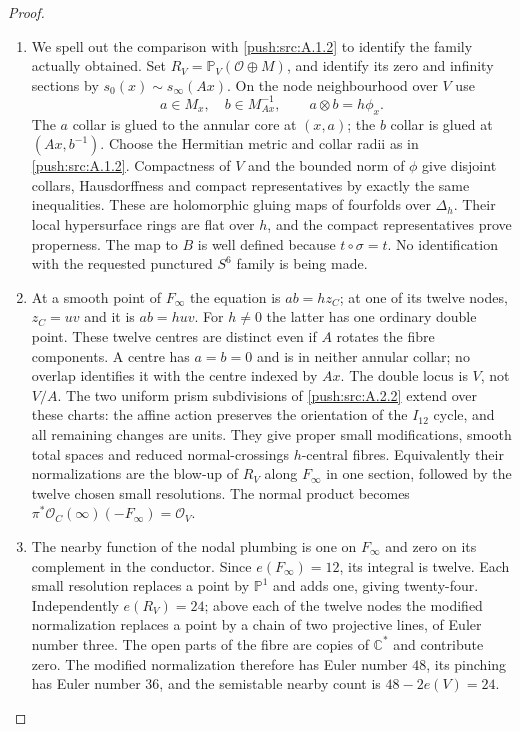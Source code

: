 \begin{proof}
\begin{enumerate}[label=\arabic*.,leftmargin=*]
\item We spell out the comparison with \ref{push:src:A.1.2}
to identify the family actually obtained.
Set $R_V=\mathbb P_V(\mathcal O\oplus M)$,
and identify its zero and infinity
sections by $s_0(x)\sim s_\infty(Ax)$.
On the node neighbourhood over $V$ use
\[
 a\in M_x,\quad b\in M_{Ax}^{-1},
 \qquad a\otimes b=h\phi_x.
\]
The $a$ collar is glued to the annular
core at $(x,a)$; the $b$ collar is glued
at $(Ax,b^{-1})$. Choose the Hermitian
metric and collar radii as in \ref{push:src:A.1.2}.
Compactness of $V$ and the bounded norm
of $\phi$ give disjoint collars,
Hausdorffness and compact representatives
by exactly the same inequalities.
These are holomorphic gluing maps of
fourfolds over $\Delta_h$.
Their local hypersurface rings are flat
over $h$, and the compact representatives
prove properness. The map to $B$ is
well defined because $t\circ\sigma=t$.
No identification with the requested
punctured $S^6$ family is being made.

\item At a smooth point of $F_\infty$ the
equation is $ab=hz_C$; at one of its
twelve nodes, $z_C=uv$ and it is
$ab=huv$. For $h\ne0$ the latter
has one ordinary double point.
These twelve centres are distinct
even if $A$ rotates the fibre
components. A centre has $a=b=0$
and is in neither annular collar;
no overlap identifies it with the
centre indexed by $Ax$.
The double locus is $V$, not $V/A$.
The two uniform prism subdivisions
of \ref{push:src:A.2.2} extend over these charts:
the affine action preserves the
orientation of the $I_{12}$ cycle,
and all remaining changes are units.
They give proper small modifications,
smooth total spaces and reduced
normal-crossings $h$-central fibres.
Equivalently their normalizations are
the blow-up of $R_V$ along $F_\infty$
in one section, followed by the twelve
chosen small resolutions. The normal
product becomes
$\pi^*\mathcal O_C(\infty)(-F_\infty)=\mathcal O_V$.

\item The nearby function of the nodal
plumbing is one on $F_\infty$ and
zero on its complement in the conductor.
Since $e(F_\infty)=12$, its integral
is twelve. Each small resolution
replaces a point by $\mathbb P^1$
and adds one, giving twenty-four.
Independently $e(R_V)=24$; above each
of the twelve nodes the modified
normalization replaces a point by
a chain of two projective lines,
of Euler number three. The open
parts of the fibre are copies of
$\mathbb C^*$ and contribute zero.
The modified normalization therefore
has Euler number $48$, its pinching
has Euler number $36$, and the
semistable nearby count is
$48-2e(V)=24$.


\end{enumerate}
\end{proof}
